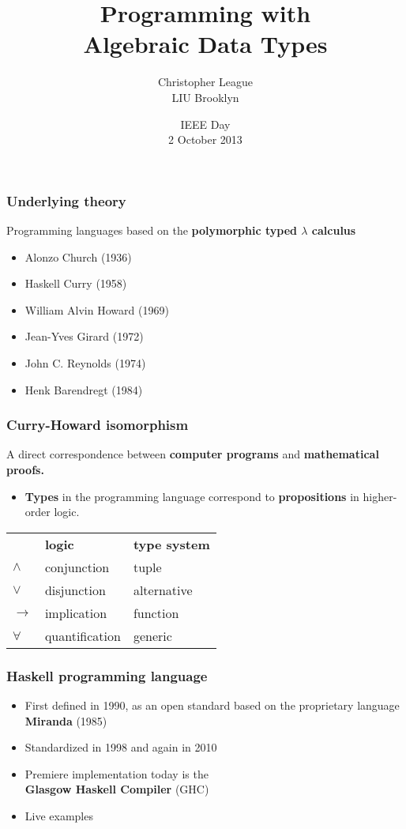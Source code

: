 \documentclass[14pt,t,usepdftitle=false,
xcolornames=x11names,svgnames,dvipsnames]{beamer}
\newcommand{\subtitleFont}[1]{{\footnotesize #1}}
\begin{document}
\title{\textbf{Programming with\\Algebraic Data Types}}
\author{Christopher League\\\subtitleFont{LIU Brooklyn}}
\date{\subtitleFont{IEEE Day\\2 October 2013}}
\maketitle

\begin{frame}
  \frametitle{Underlying theory}
  Programming languages based on the 
  \textbf{polymorphic typed $\lambda$ calculus}
  \begin{itemize}
  \item Alonzo Church (1936)
  \item Haskell Curry (1958)
  \item William Alvin Howard (1969)
  \item Jean-Yves Girard (1972)
  \item John C. Reynolds (1974)
  \item Henk Barendregt (1984)
  \end{itemize}
\end{frame}

\begin{frame}
  \frametitle{Curry-Howard isomorphism}
  A direct correspondence between \textbf{computer programs} and
  \textbf{mathematical proofs.}
  \begin{itemize}
  \item \textbf{Types} in the programming language correspond to
    \textbf{propositions} in higher-order logic.
  \end{itemize}
  \begin{center}
      \begin{tabular}{lll}
        &\bf logic&\bf type system\\
        $\wedge$ & conjunction & tuple\\
        $\vee$& disjunction & alternative\\
        $\rightarrow$& implication & function\\
        $\forall$&quantification& generic\\
      \end{tabular}
    \end{center}
\end{frame}

\begin{frame}
  \frametitle{Haskell programming language}
  \begin{itemize}
  \item First defined in 1990, as an open standard based on the
    proprietary language \textbf{Miranda} (1985)
  \item Standardized in 1998 and again in 2010
  \item Premiere implementation today is the\\\textbf{Glasgow Haskell
      Compiler} (GHC)
    \vskip1cm
  \item Live examples
  \end{itemize}
\end{frame}
\end{document}

